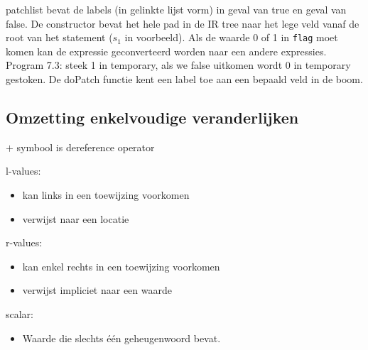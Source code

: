 
patchlist bevat de labels (in gelinkte lijst vorm) in geval van true en geval van false. De constructor bevat het hele pad in de IR tree naar het lege veld vanaf de root van het statement ($s_1$ in voorbeeld). Als de waarde 0 of 1 in \texttt{flag} moet komen kan de expressie geconverteerd worden naar een andere expressies. Program 7.3: steek 1 in temporary, als we false uitkomen wordt 0 in temporary gestoken. De doPatch functie kent een label toe aan een bepaald veld in de boom.

\subsection{Omzetting enkelvoudige veranderlijken}

$+$ symbool is dereference operator


l-values:
\begin{itemize}
	\item kan links in een toewijzing voorkomen
	\item verwijst naar een locatie
\end{itemize}

r-values:
\begin{itemize}
	\item kan enkel rechts in een toewijzing voorkomen
	\item verwijst impliciet naar een waarde
\end{itemize}

scalar:
\begin{itemize}
	\item Waarde die slechts één geheugenwoord bevat.
\end{itemize}


